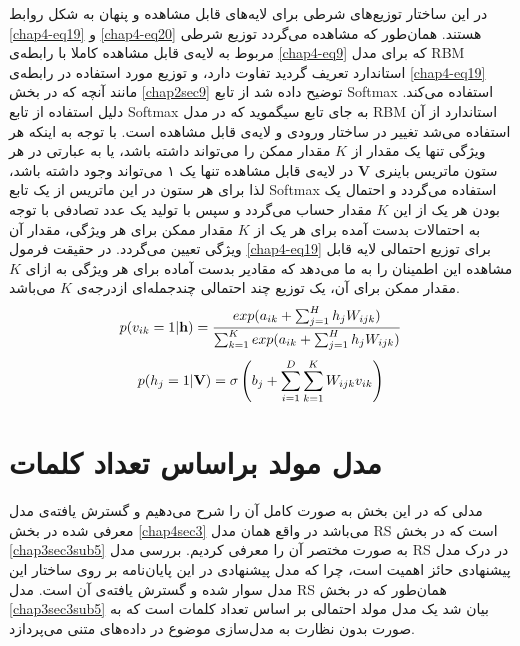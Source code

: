 در این ساختار توزیع‌های شرطی برای لایه‌های قابل مشاهده و پنهان به شکل روابط
\ref{chap4-eq19}
و
\ref{chap4-eq20}
هستند. همان‌طور که مشاهده می‌‌گردد توزیع شرطی مربوط به لایه‌ی قابل مشاهده کاملا با رابطه‌ی
\ref{chap4-eq9}
که برای مدل
RBM
استاندارد تعریف گردید تفاوت دارد، و توزیع مورد استفاده در رابطه‌ی
\ref{chap4-eq19}
 مانند آنچه که در بخش
\ref{chap2sec9}
توضیح داده شد از تابع
Softmax
استفاده می‌‌کند. دلیل استفاده از تابع
Softmax
به جای تابع سیگموید که در مدل
RBM
استاندارد از آن استفاده می‌‌شد تغییر در ساختار ورودی و لایه‌ی قابل مشاهده است. با توجه به اینکه هر ویژگی‌ تنها یک مقدار از
$K$
مقدار ممکن را می‌‌تواند داشته باشد، یا به عبارتی در هر ستون ماتریس باینری
$\textbf{V}$
 در لایه‌ی قابل مشاهده تنها یک ۱ می‌‌تواند وجود داشته باشد، لذا برای هر ستون در این ماتریس از یک تابع
Softmax
استفاده می‌گردد و احتمال یک بودن هر یک از این
$K$
 مقدار حساب می‌گردد و سپس با تولید یک عدد تصادفی با توجه به احتمالات بدست آمده برای هر یک از
$K$
مقدار ممکن برای هر ویژگی‌، مقدار آن ویژگی‌ تعیین می‌‌گردد. در حقیقت فرمول
\ref{chap4-eq19}
برای توزیع احتمالی‌ لایه قابل مشاهده این اطمینان را به ما می‌دهد که مقادیر بدست آماده برای هر ویژگی‌ به ازای
$K$
مقدار ممکن برای آن، یک توزیع چند احتمالی‌ چندجمله‌ای ازدرجه‌ی
$K$
می‌باشد.
\begin{align}
	\centering
	\label{chap4-eq19}
	p(v_{ik}=1|\textbf{h})=\dfrac{exp(a_{ik}+\sum_{j=1}^{H}h_jW_{ijk})}{\sum_{k=1}^{K}exp(a_{ik}+\sum_{j=1}^{H}h_jW_{ijk})}
\end{align}
\begin{align}
	\centering
	\label{chap4-eq20}
	p(h_{j}=1|\textbf{V})=\sigma \left( b_j +  \sum_{i=1}^{D}\sum_{k=1}^{K}W_{ijk}v_{ik} \right)
\end{align}

\section{مدل مولد براساس تعداد کلمات}
\label{chap4sec4}

مدلی‌ که در این بخش به صورت کامل آن را شرح می‌‌دهیم و گسترش یافته‌ی مدل معرفی‌ شده در بخش
\ref{chap4sec3}
می‌باشد در واقع همان مدل
RS
 است که در بخش
\ref{chap3sec3sub5}
به صورت مختصر آن را معرفی‌ کردیم. بررسی‌ مدل
RS
در درک مدل پیشنهادی حائز اهمیت است، چرا که مدل پیشنهادی در این پایان‌‌نامه بر روی ساختار این مدل سوار شده و گسترش یافته‌ی آن است. مدل
RS
 همان‌طور که در بخش
\ref{chap3sec3sub5}
بیان شد یک مدل مولد احتمالی‌ بر اساس تعداد کلمات است که به صورت بدون نظارت به مدل‌سازی موضوع در داده‌های متنی می‌‌پردازد.

